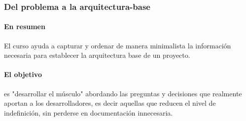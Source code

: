 \documentclass[11pt]{article}
\begin{document}
\subsubsection*{Del problema a la arquitectura-base}
\paragraph{En resumen} El curso ayuda a capturar y ordenar de manera minimalista
la informaci\'on necesaria para establecer la arquitectura base de un proyecto.

\paragraph{El objetivo}
es "desarrollar el m\'usculo" abordando las preguntas y decisiones que realmente
aportan a los desarrolladores, es decir aquellas que reducen el nivel de indefinici\'on,
sin perderse en documentaci\'on innecesaria.
\end{document}
